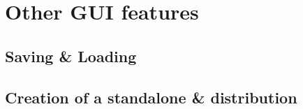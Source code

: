 
\section{Other GUI features} %
\label{sec:other_gui_features}

	\subsection{Saving \& Loading} %
	\label{sec:saving_and_loading}
	

	\subsection{Creation of a standalone \& distribution} %
	\label{sec:creation_of_a_standalone_and_distribution}
	





